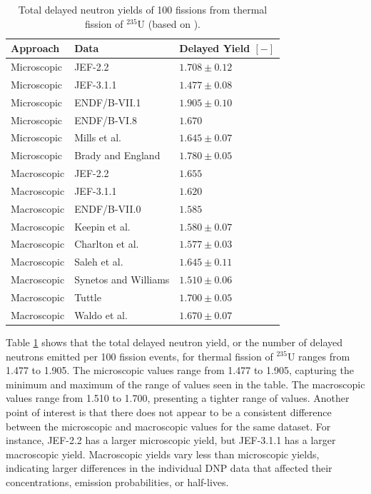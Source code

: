 \begin{table}[!ht]
    \caption{Total delayed neutron yields of 100 fissions from thermal fission of $^{235}$U (based on \cite{huynh2014calculation}).}
    \centering
    \begin{tabular}{lll}
    \hline
       Approach & Data & Delayed Yield $[-]$\\
       \hline
        Microscopic & JEF-2.2 \cite{bank2000jef} & $1.708 \pm 0.12$\\
        Microscopic & JEF-3.1.1 \cite{santamarina2009jeff} & $1.477 \pm 0.08$\\
        Microscopic & ENDF/B-VII.1 \cite{chadwick2011endf} & $1.905 \pm 0.10$\\
        Microscopic & ENDF/B-VI.8 \cite{endf6}   & $1.670$ \\
        Microscopic & Mills et al. \cite{mills1991study}    & $1.645 \pm 0.07$ \\
        Microscopic & Brady and England \cite{brady1989delayed} & $1.780 \pm 0.05$\\
        \hline
        Macroscopic & JEF-2.2 \cite{bank2000jef} & $1.655$\\
        Macroscopic & JEF-3.1.1 \cite{santamarina2009jeff} & $1.620$\\
        Macroscopic & ENDF/B-VII.0 \cite{chadwick2006endf} & $1.585$\\
        Macroscopic & Keepin et al. \cite{keepin1957delayed} & $1.580 \pm 0.07$ \\
        Macroscopic & Charlton et al. \cite{charlton1996delayed}\tnote{*} & $1.577 \pm 0.03$\\
        Macroscopic & Saleh et al. \cite{saleh1997measurements} & $1.645 \pm 0.11$ \\
        Macroscopic & Synetos and Williams \cite{synetos1983delayed}\tnote{*} & $1.510 \pm 0.06$ \\
        Macroscopic & Tuttle \cite{tuttle1975delayed}    & $1.700 \pm  0.05$\\
        Macroscopic & Waldo et al.\cite{waldo1981delayed}    & $1.670 \pm 0.07$ \\
        \hline
    \end{tabular}
    \label{tab:total-delnu-compare}
\end{table}

Table \ref{tab:total-delnu-compare} shows that the total delayed neutron yield, or the number of delayed neutrons emitted per 100 fission events, for thermal fission of $^{235}$U ranges from 1.477 to 1.905.
The microscopic values range from 1.477 to 1.905, capturing the minimum and maximum of the range of values seen in the table.
The macroscopic values range from 1.510 to 1.700, presenting a tighter range of values.
Another point of interest is that there does not appear to be a consistent difference between the microscopic and macroscopic values for the same dataset.
For instance, JEF-2.2 has a larger microscopic yield, but JEF-3.1.1 has a larger macroscopic yield.
Macroscopic yields vary less than microscopic yields, indicating larger differences in the individual \gls{DNP} data that affected their concentrations, emission probabilities, or half-lives.